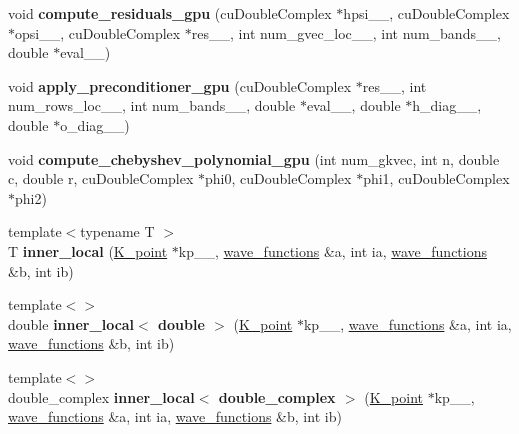 \begin{DoxyCompactItemize}
\item 
\hypertarget{namespacesirius_af8f41d0709e5abc1c206ef63b3a16e15}{}void {\bfseries compute\+\_\+residuals\+\_\+gpu} (cu\+Double\+Complex $\ast$hpsi\+\_\+\+\_\+, cu\+Double\+Complex $\ast$opsi\+\_\+\+\_\+, cu\+Double\+Complex $\ast$res\+\_\+\+\_\+, int num\+\_\+gvec\+\_\+loc\+\_\+\+\_\+, int num\+\_\+bands\+\_\+\+\_\+, double $\ast$eval\+\_\+\+\_\+)\label{namespacesirius_af8f41d0709e5abc1c206ef63b3a16e15}

\item 
\hypertarget{namespacesirius_ab007a8fdf09de8b16f1886426f5b9c98}{}void {\bfseries apply\+\_\+preconditioner\+\_\+gpu} (cu\+Double\+Complex $\ast$res\+\_\+\+\_\+, int num\+\_\+rows\+\_\+loc\+\_\+\+\_\+, int num\+\_\+bands\+\_\+\+\_\+, double $\ast$eval\+\_\+\+\_\+, double $\ast$h\+\_\+diag\+\_\+\+\_\+, double $\ast$o\+\_\+diag\+\_\+\+\_\+)\label{namespacesirius_ab007a8fdf09de8b16f1886426f5b9c98}

\item 
\hypertarget{namespacesirius_a07e7f559c696b3f8f4ddc7715501978c}{}void {\bfseries compute\+\_\+chebyshev\+\_\+polynomial\+\_\+gpu} (int num\+\_\+gkvec, int n, double c, double r, cu\+Double\+Complex $\ast$phi0, cu\+Double\+Complex $\ast$phi1, cu\+Double\+Complex $\ast$phi2)\label{namespacesirius_a07e7f559c696b3f8f4ddc7715501978c}

\item 
\hypertarget{namespacesirius_adf82d8471133be345abd50d52bbbbb22}{}{\footnotesize template$<$typename T $>$ }\\T {\bfseries inner\+\_\+local} (\hyperlink{classsirius_1_1_k__point}{K\+\_\+point} $\ast$kp\+\_\+\+\_\+, \hyperlink{classsddk_1_1wave__functions}{wave\+\_\+functions} \&a, int ia, \hyperlink{classsddk_1_1wave__functions}{wave\+\_\+functions} \&b, int ib)\label{namespacesirius_adf82d8471133be345abd50d52bbbbb22}

\item 
\hypertarget{namespacesirius_abb6ec5c71e9d9e568a4e7dcd7f3eb0a8}{}{\footnotesize template$<$$>$ }\\double {\bfseries inner\+\_\+local$<$ double $>$} (\hyperlink{classsirius_1_1_k__point}{K\+\_\+point} $\ast$kp\+\_\+\+\_\+, \hyperlink{classsddk_1_1wave__functions}{wave\+\_\+functions} \&a, int ia, \hyperlink{classsddk_1_1wave__functions}{wave\+\_\+functions} \&b, int ib)\label{namespacesirius_abb6ec5c71e9d9e568a4e7dcd7f3eb0a8}

\item 
\hypertarget{namespacesirius_ab6667e0c3e706d9cec91b1505e0c7dd7}{}{\footnotesize template$<$$>$ }\\double\+\_\+complex {\bfseries inner\+\_\+local$<$ double\+\_\+complex $>$} (\hyperlink{classsirius_1_1_k__point}{K\+\_\+point} $\ast$kp\+\_\+\+\_\+, \hyperlink{classsddk_1_1wave__functions}{wave\+\_\+functions} \&a, int ia, \hyperlink{classsddk_1_1wave__functions}{wave\+\_\+functions} \&b, int ib)\label{namespacesirius_ab6667e0c3e706d9cec91b1505e0c7dd7}


\end{DoxyCompactItemize}

